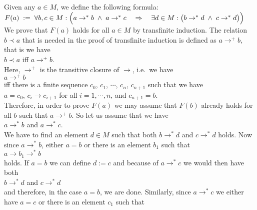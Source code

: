 \proof
Given any $a \in M$, we define the following formula:
\\[0.2cm]
\hspace*{1.3cm}
$F(a) \;:=\; \forall b, c \in M: \Bigl(a \rightarrow^* b \;\wedge\; a \rightarrow^*c \quad\Rightarrow\quad
 \exists d \in M: \bigl(b \rightarrow^* d \;\wedge\; c \rightarrow^* d\bigr)\Bigr)
$
\\[0.2cm]
We  prove that $F(a)$ holds for all $a \in M$ by transfinite induction.  The relation $b \prec a$
that is needed in the proof of transfinite induction is defined as $a \rightarrow^+ b$, that is we have
\\[0.2cm]
\hspace*{1.3cm}
$b \prec a$ \quad iff $a \rightarrow^+ b$.
\\[0.2cm]
Here, $\rightarrow^+$ is the transitive closure of $\rightarrow$, i.e.~we have
\\[0.2cm]
\hspace*{1.3cm}
$a \rightarrow^+ b$
\\[0.2cm]
iff there is a finite sequence $c_0$, $c_1$, $\cdots$, $c_n$, $c_{n+1}$ such that we have
\\[0.2cm]
\hspace*{1.3cm}
$a = c_0$, \quad $c_i \rightarrow c_{i+1}$ for all $i=1, \cdots,n$, \quad and \quad $c_{n+1} = b$.
\\[0.2cm]
Therefore, in order to prove $F(a)$ we may assume that $F(b)$ already holds for all $b$ such that
$a \rightarrow^+ b$.  So let us assume that we have
\\[0.2cm]
\hspace*{1.3cm}
$a \rightarrow^* b$ \quad and \quad $a \rightarrow^* c$.
\\[0.2cm]
We have to find an element $d \in M$ such that both $b \rightarrow^* d$ and $c \rightarrow^* d$ holds.
Now since $a \rightarrow^* b$, either $a = b$ or there is an element $b_1$ such that
\\[0.2cm]
\hspace*{1.3cm}
$a \rightarrow b_1 \rightarrow^* b$
\\[0.2cm]
holds.  If $a = b$ we can define $d := c$ and because of $a \rightarrow^* c$ we would then have both
\\[0.2cm]
\hspace*{1.3cm}
$b \rightarrow^* d$ \quad and \quad $c \rightarrow^* d$
\\[0.2cm]
and therefore, in the case $a = b$, we are done.  Similarly, since $a \rightarrow^* c$ we either have
$a = c$ or there is an element $c_1$ such that
